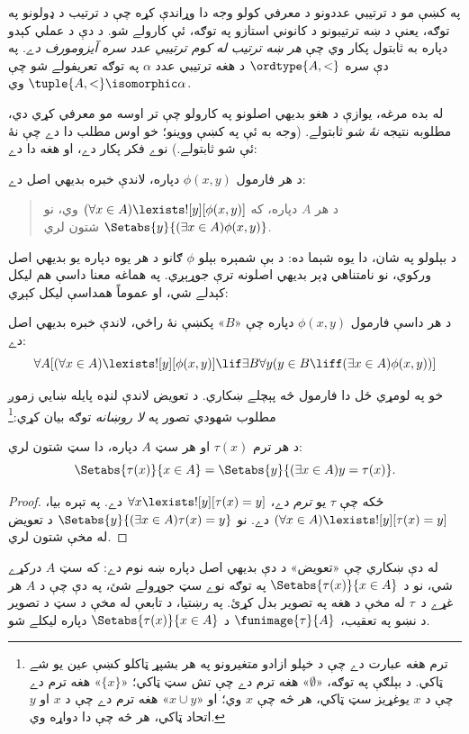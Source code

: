 \documentclass[../../../include/open-logic-section]{subfiles}
\begin{document}

په  کښې مو د ترتيبي عددونو د معرفي کولو
وجه دا وړاندې کړه چې د ترتيب د ډولونو په توګه، يعنې د ښه ترتيبونو د
کانوني استازو په توګه، ئې کارولے شو. د دې د عملي کېدو دپاره به ثابتول
پکار وي چې \emph{هر ښه ترتيب له کوم ترتيبي عدد سره آيزومورف دے}.
په دې سره $\ordtype{A, <}$ د هغه ترتيبي عدد $\alpha$ په توګه تعريفولے
شو چې $\tuple{A, <} \isomorphic \alpha$ وي.

له بده مرغه، يوازې د هغو بديهي اصلونو په کارولو چې تر اوسه مو معرفي
کړي دي، مطلوبه نتيجه \emph{نۀ شو} ثابتولے. (وجه به ئې په
 کښې ووينو؛ خو اوس مطلب دا دے چې
نۀ ئې شو ثابتولے.) نوے فکر پکار دے، او هغه دا دے:

\begin{axiom}
د هر فارمول $\phi(x, y)$ دپاره، لاندې خبره بديهي اصل دے:
\begin{quote}
	د هر $A$ دپاره، که $(\forall x \in A)\lexists![y][\phi(x,y)]$ وي، نو
	$\Setabs{y}{(\exists x \in A)\phi(x,y)}$ شتون لري.
\end{quote}
\end{axiom}
\noindent
د بېلولو په شان، دا يوه شېما ده: د بې شمېره بېلو $\phi$ ګانو د هر يوه
دپاره يو بديهي اصل ورکوي، نو نامتناهي ډېر بديهي اصلونه ترې جوړېږي.
په هماغه معنا داسې هم ليکل کېدلے شي، او عموماً همداسې ليکل کېږي:

\begin{defish}
د هر داسې فارمول $\phi(x,y)$ دپاره چې «$B$» پکښې نۀ راځي، لاندې خبره بديهي اصل دے:
\[
\forall A[(\forall x \in A)\lexists![y][\phi(x,y)] \lif \exists B\forall y (y \in B \liff (\exists x \in A)\phi(x,y))]
\]
\end{defish}

خو په لومړي ځل دا فارمول څه پېچلے ښکاري. د تعويض لاندې لنډه پايله ښايي
زموږ مطلوب شهودي تصور په \emph{لا روښانه} توګه بيان کړي:\footnote{ترم هغه
عبارت دے چې د خپلو ازادو متغيرونو په هر بشپړ ټاکلو کښې عين يو شے ټاکي.
د بېلګې په توګه، «$\emptyset$» هغه ترم دے چې تش سټ ټاکي؛ «$\{x\}$» هغه
ترم دے چې د $x$ يوغړيز سټ ټاکي، هر څه چې $x$ وي؛ او «$x \cup y$» هغه
ترم دے چې د $x$ او $y$ اتحاد ټاکي، هر څه چې دا دواړه وي.}

\begin{cor}
د هر ترم $\tau(x)$ او هر سټ $A$ دپاره، دا سټ شتون لري:
\[
	\Setabs{\tau(x)}{x \in A} = \Setabs{y}{(\exists x \in A)y = \tau(x)}.
\]
\end{cor}

\begin{proof}
ځکه چې $\tau$ يو \emph{ترم} دے، $\forall x \lexists![y][\tau(x) = y]$ دے.
په تېره بيا، $(\forall x \in A)\lexists![y][\tau(x) = y]$ دے. نو
$\Setabs{y}{(\exists x \in A)\tau(x) = y}$ د تعويض له مخې شتون لري.
\end{proof}
\noindent
له دې ښکاري چې «تعويض» د دې بديهي اصل دپاره ښه نوم دے: که سټ $A$ درکړے
شي، نو د $\Setabs{\tau(x)}{x \in A}$ په توګه نوے سټ جوړولے شئ، په دې
چې د $A$ هر غړے د~$\tau$ له مخې د هغه په تصوير بدل کړئ. په رښتيا، د
تابعې له مخې د سټ د تصوير د نښو په تعقيب،
$\funimage{\tau}{A}$ د $\Setabs{\tau(x)}{x \in A}$ دپاره ليکلے شو.
\end{document}
